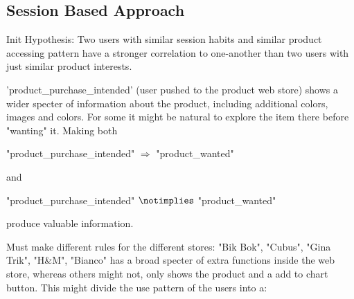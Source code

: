 






\subsection{Session Based Approach}
Init Hypothesis:
Two users with similar session habits and similar product accessing pattern
have a stronger correlation to one-another than two users with just similar
product interests.


'product\_purchase\_intended' (user pushed to the product web store) shows a
wider specter of information about the product, including additional colors,
images and colors.  For some it might be natural to explore the item there
before "wanting" it. Making both

"product\_purchase\_intended" $\Rightarrow$ "product\_wanted"

and

"product\_purchase\_intended" $\notimplies$ "product\_wanted"

produce valuable information.

Must make different rules for the different stores:
"Bik Bok", "Cubus", "Gina Trik", "H\&M", "Bianco" has a broad specter of extra
functions inside the web store, whereas others might not, only shows the
product and a add to chart button.  This might divide the use pattern of the
users into a:


